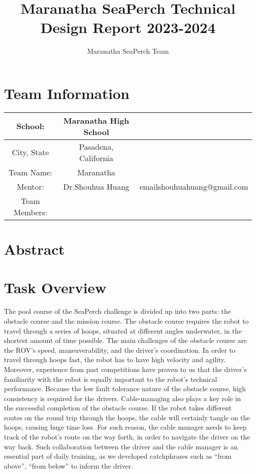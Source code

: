 \documentclass[11pt, oneside]{article}   	%
\title{Maranatha SeaPerch Technical Design Report 2023-2024}
\author{Maranatha SeaPerch Team}
\begin{document}
\maketitle

\pagebreak

\section*{Team Information}
\begin{center}
	\begin{tabular}{|c|c|c|}
		\hline
		School: & Maranatha High School & \\
		\hline
		City, State & Pasadena, California & \\
		\hline
		Team Name: & Maranatha & \\
		\hline
		Mentor: & Dr.Shouhua Huang & emailshouhuahuang@gmail.com \\
		\hline
		Team Members: & & \\
		\hline


	\end{tabular}
\end{center}

\pagebreak

\section{Abstract}

\section{Task Overview}
	The pool course of the SeaPerch challenge is divided up into two parts: the obstacle course and the mission course. The obstacle course requires the robot to travel through a series of hoops, situated at different angles underwater, in the shortest amount of time possible. The main challenges of the obstacle course are the ROV’s speed, maneuverability, and the driver’s coordination. In order to travel through hoops fast, the robot has to have high velocity and agility. Moreover, experience from past competitions have proven to us that the driver’s familiarity with the robot is equally important to the robot’s technical performance. Because the low fault tolerance nature of the obstacle course, high consistency is required for the drivers. Cable-managing also plays a key role in the successful completion of the obstacle course. If the robot takes different routes on the round trip through the hoops, the cable will certainly tangle on the hoops, causing huge time loss. For such reason, the cable manager needs to keep track of the robot’s route on the way forth, in order to navigate the driver on the way back. Such collaboration between the driver and the cable manager is an essential part of daily training, as we developed catchphrases such as “from above”, “from below” to inform the driver.
\end{document}
